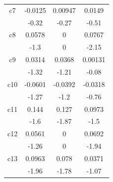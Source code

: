 \begin{table}[H]
\begin{tabular}{cccc}
    \multicolumn{1}{p{6.93em}}{c7}  & -0.0125                               & 0.00947                             & 0.0149                               \\
                                    & -0.32                                 & -0.27                               & -0.51                                \\
    \multicolumn{1}{p{6.93em}}{c8}  & 0.0578                                & 0                                   & 0.0767                               \\
                                    & -1.3                                  & 0                                   & -2.15                                \\
    \multicolumn{1}{p{6.93em}}{c9}  & 0.0314                                & 0.0368                              & 0.00131                              \\
                                    & -1.32                                 & -1.21                               & -0.08                                \\
    \multicolumn{1}{p{6.93em}}{c10} & -0.0601                               & -0.0392                             & -0.0318                              \\
                                    & -1.27                                 & -1.2                                & -0.76                                \\
    \multicolumn{1}{p{6.93em}}{c11} & 0.144                                 & 0.127                               & 0.0973                               \\
                                    & -1.6                                  & -1.87                               & -1.5                                 \\
    \multicolumn{1}{p{6.93em}}{c12} & 0.0561                                & 0                                   & 0.0692                               \\
                                    & -1.26                                 & 0                                   & -1.94                                \\
    \multicolumn{1}{p{6.93em}}{c13} & 0.0963                                & 0.078                               & 0.0371                               \\
                                    & -1.96                                 & -1.78                               & -1.07                                \\

\end{tabular}
\end{table}
